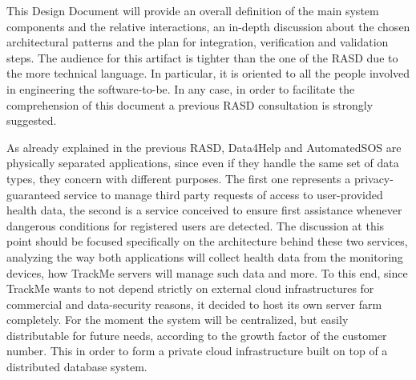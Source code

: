 


{}
{\setlength{\parskip}{0.5cm}
\raggedright

This Design Document will provide an overall definition of the main system components and the relative interactions, an in-depth discussion about the chosen architectural patterns and the plan for integration, verification and validation steps. The audience for this artifact is tighter than the one of the RASD due to the more technical language. In particular, it is oriented to all the people involved in engineering the software-to-be. In any case, in order to facilitate the comprehension of this document a previous RASD consultation is strongly suggested.

{}

As already explained in the previous RASD, Data4Help and AutomatedSOS are physically separated applications, since even if they handle the same set of data types, they concern with different purposes. The first one represents a privacy-guaranteed service to manage third party requests of access to user-provided health data, the second is a service conceived to ensure first assistance whenever dangerous conditions for registered users are detected. The discussion at this point should be focused specifically on the architecture behind these two services, analyzing the way both applications will collect health data from the monitoring devices, how TrackMe servers will manage such data and more. To this end, since TrackMe wants to not depend strictly on external cloud infrastructures for commercial and data-security reasons, it decided to host  its own server farm completely. For the moment the system will be centralized, but easily distributable for future needs, according to the growth factor of the customer number. This in order to form a private cloud infrastructure built on top of a distributed database system. 



}
